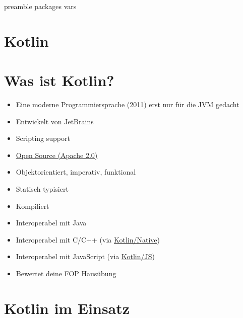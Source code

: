 \RequirePackage{import}
{preamble}
{packages}
{vars}


    \section{Kotlin}\label{sec:kotlin}
    \begin{frame}[c]
        \centering
        \Large
        
        \linebreak
    \end{frame}


    \section{Was ist Kotlin?}\label{sec:was-ist-kotlin?}
    \begin{frame}
        \slidehead
        \begin{itemize}[<+->]
            \item Eine moderne Programmiersprache (2011) erst nur für die JVM gedacht
            \item Entwickelt von JetBrains
            \item Scripting support
            \item \href{https://github.com/JetBrains/kotlin}{Open Source (Apache 2.0)}
            \item Objektorientiert, imperativ, funktional
            \item Statisch typisiert
            \item Kompiliert
            \item Interoperabel mit Java
            \item Interoperabel mit C/C++ (via \href{https://kotlinlang.org/docs/native-overview.html}{Kotlin/Native})
            \item Interoperabel mit JavaScript (via \href{https://kotlinlang.org/docs/js-overview.html}{Kotlin/JS})
            \item Bewertet deine FOP Hausübung
        \end{itemize}
    \end{frame}


    \section{Kotlin im Einsatz}\label{sec:kotlin-im-einsatz}

